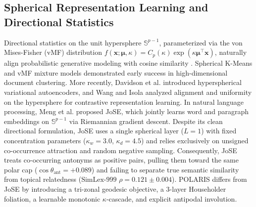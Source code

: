 \documentclass[journal]{IEEEtran}
\begin{document}
\subsection{Spherical Representation Learning and Directional Statistics}
Directional statistics on the unit hypersphere $\mathbb{S}^{p-1}$, parameterized via the von Mises-Fisher (vMF) distribution $f(\mathbf{x}; \boldsymbol{\mu}, \kappa) = C_p(\kappa) \exp(\kappa \boldsymbol{\mu}^\top \mathbf{x})$, naturally align probabilistic generative modeling with cosine similarity \cite{banerjee2005clustering,mardia2000directional}. Spherical K-Means \cite{dhillon2001concept,banerjee2005clustering} and vMF mixture models \cite{gopal2014von} demonstrated early success in high-dimensional document clustering. More recently, Davidson et al. \cite{davidson2018hyperspherical} introduced hyperspherical variational autoencoders, and Wang and Isola \cite{wang2020understanding} analyzed alignment and uniformity on the hypersphere for contrastive representation learning. In natural language processing, Meng et al. \cite{meng2019spherical} proposed JoSE, which jointly learns word and paragraph embeddings on $\mathbb{S}^{p-1}$ via Riemannian gradient descent. Despite its clean directional formulation, JoSE uses a single spherical layer ($L=1$) with fixed concentration parameters ($\kappa_w = 3.0$, $\kappa_d = 4.5$) and relies exclusively on unsigned co-occurrence attraction and random negative sampling. Consequently, JoSE treats co-occurring antonyms as positive pairs, pulling them toward the same polar cap ($\cos\theta_{\text{ant}} = +0.089$) and failing to separate true semantic similarity from topical relatedness ($\text{SimLex-999 } \rho = 0.121 \pm 0.004$). POLARIS differs from JoSE by introducing a tri-zonal geodesic objective, a 3-layer Householder foliation, a learnable monotonic $\kappa$-cascade, and explicit antipodal involution.
\end{document}
